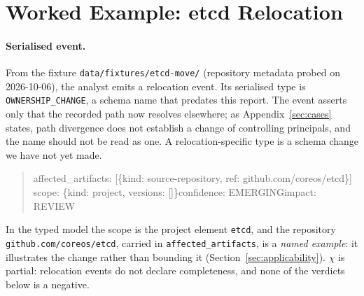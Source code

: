 \documentclass[11pt,a4paper]{article}
\newcommand{\code}[1]{\texttt{#1}}
\begin{document}



\appendix

\section{Worked Example: etcd Relocation}
\label{app:example}
\paragraph{Serialised event.} From the fixture
\code{data/fixtures/etcd-move/} (repository metadata probed on
2026-10-06), the analyst emits a relocation event. Its serialised type
is \code{OWNERSHIP\_CHANGE}, a schema name that predates this report.
The event asserts only that the recorded path now resolves elsewhere;
as Appendix~\ref{sec:cases} states, path divergence does not establish
a change of controlling principals, and the name should not be read
as one. A relocation-specific type is a schema change we have not yet
made.
\begin{quote}\footnotesize\ttfamily
affected\_artifacts: [\{kind: source-repository, ref: github.com/coreos/etcd\}]\\
scope: \{kind: project, versions: []\}\quad confidence: EMERGING\quad impact: REVIEW
\end{quote}
In the typed model the scope is the project element \code{etcd}, and
the repository \code{github.com/\allowbreak coreos/\allowbreak etcd}, carried in
\code{affected\_\allowbreak artifacts}, is a \emph{named example}: it illustrates
the change rather than bounding it (Section~\ref{sec:applicability}).
$\chi$ is partial: relocation events do not declare completeness, and
none of the verdicts below is a negative.
\end{document}
